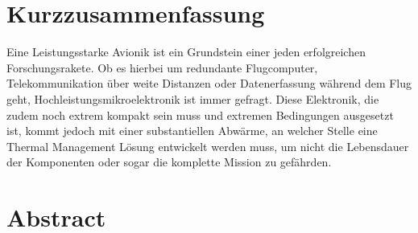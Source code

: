 \chapter*{Kurzzusammenfassung} %
\label{chap:Kurzzusammenfassung}


Eine Leistungsstarke Avionik ist ein Grundstein einer jeden erfolgreichen Forschungsrakete. Ob es hierbei um redundante Flugcomputer, Telekommunikation über weite Distanzen oder Datenerfassung während dem Flug geht, Hochleistungsmikroelektronik ist immer gefragt. Diese Elektronik, die zudem noch extrem kompakt sein muss und extremen Bedingungen ausgesetzt ist, kommt jedoch mit einer substantiellen Abwärme, an welcher Stelle eine Thermal Management Lösung entwickelt werden muss, um nicht die Lebensdauer der Komponenten oder sogar die komplette Mission zu gefährden.


\chapter*{Abstract} %
\label{chap:Abstract}
